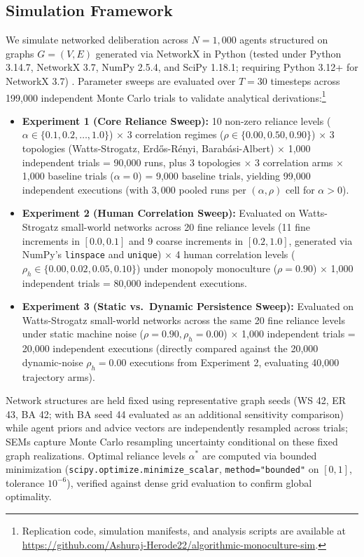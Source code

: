 \documentclass
[letterpaper]{article}
\begin{document}
\subsection{Simulation Framework}
We simulate networked deliberation across $N = 1,000$ agents structured on graphs $G = (V, E)$ generated via NetworkX in Python (tested under Python 3.14.7, NetworkX 3.7, NumPy 2.5.4, and SciPy 1.18.1; requiring Python 3.12+ for NetworkX 3.7) \citep{hagberg2008exploring}. Parameter sweeps are evaluated over $T = 30$ timesteps across 199,000 independent Monte Carlo trials to validate analytical derivations:\footnote{Replication code, simulation manifests, and analysis scripts are available at \url{https://github.com/Ashuraj-Herode22/algorithmic-monoculture-sim}.}
\begin{itemize}\setlength{\itemsep}{0pt}\setlength{\parskip}{0pt}\setlength{\parsep}{0pt}
    \item \textbf{Experiment 1 (Core Reliance Sweep):} 10 non-zero reliance levels ($\alpha \in \{0.1, 0.2, \dots, 1.0\}$) $\times$ 3 correlation regimes ($\rho \in \{0.00, 0.50, 0.90\}$) $\times$ 3 topologies (Watts-Strogatz, Erd\H{o}s-R\'enyi, Barab\'asi-Albert) $\times$ 1,000 independent trials = 90,000 runs, plus 3 topologies $\times$ 3 correlation arms $\times$ 1,000 baseline trials ($\alpha = 0$) = 9,000 baseline trials, yielding 99,000 independent executions (with $3,000$ pooled runs per $(\alpha, \rho)$ cell for $\alpha > 0$).
    \item \textbf{Experiment 2 (Human Correlation Sweep):} Evaluated on Watts-Strogatz small-world networks across 20 fine reliance levels (11 fine increments in $[0.0, 0.1]$ and 9 coarse increments in $[0.2, 1.0]$, generated via NumPy's \texttt{linspace} and \texttt{unique}) $\times$ 4 human correlation levels ($\rho_h \in \{0.00, 0.02, 0.05, 0.10\}$) under monopoly monoculture ($\rho = 0.90$) $\times$ 1,000 independent trials = 80,000 independent executions.
    \item \textbf{Experiment 3 (Static vs.\ Dynamic Persistence Sweep):} Evaluated on Watts-Strogatz small-world networks across the same 20 fine reliance levels under static machine noise ($\rho = 0.90, \rho_h = 0.00$) $\times$ 1,000 independent trials = 20,000 independent executions (directly compared against the 20,000 dynamic-noise $\rho_h = 0.00$ executions from Experiment 2, evaluating 40,000 trajectory arms).
\end{itemize}
Network structures are held fixed using representative graph seeds (WS 42, ER 43, BA 42; with BA seed 44 evaluated as an additional sensitivity comparison) while agent priors and advice vectors are independently resampled across trials; SEMs capture Monte Carlo resampling uncertainty conditional on these fixed graph realizations. Optimal reliance levels $\alpha^*$ are computed via bounded minimization (\texttt{scipy.optimize.minimize\_scalar}, \texttt{method="bounded"} on $[0, 1]$, tolerance $10^{-6}$), verified against dense grid evaluation to confirm global optimality.
\end{document}
